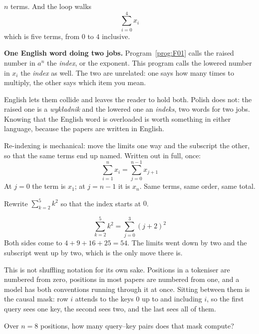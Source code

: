 \begin{fr}
\begin{ansblock}
$n$ terms. And the loop walks
\[ \sum_{i=0}^{4} x_i \]
which is five terms, from $0$ to $4$ inclusive.
\end{ansblock}

\begin{notationbox}
\textbf{One English word doing two jobs.} Program~\ref{prog:F01} calls the
raised number in $a^{n}$ the \emph{index}, or the exponent. This program calls
the lowered number in $x_i$ the \emph{index} as well. The two are unrelated:
one says how many times to multiply, the other says which item you mean.

English lets them collide and leaves the reader to hold both. Polish does not:
the raised one is a \emph{wykładnik} and the lowered one an \emph{indeks}, two
words for two jobs. Knowing that the English word is overloaded is worth
something in either language, because the papers are written in English.
\end{notationbox}

Re-indexing is mechanical: move the limits one way and the subscript the other,
so that the same terms end up named. Written out in full, once:
\[ \sum_{i=1}^{n} x_i = \sum_{j=0}^{n-1} x_{j+1} \]
At $j = 0$ the term is $x_1$; at $j = n-1$ it is $x_n$. Same terms, same
order, same total.

Rewrite $\sum_{k=2}^{5} k^{2}$ so that the index starts at $0$.
\nextframe
\end{fr}

\begin{fr}
\begin{ansblock}
\[ \sum_{k=2}^{5} k^{2} = \sum_{j=0}^{3} (j+2)^{2} \]
Both sides come to $4 + 9 + 16 + 25 = 54$. The limits went down by two and the
subscript went up by two, which is the only move there is.
\end{ansblock}

This is not shuffling notation for its own sake. Positions in a tokeniser are
numbered from zero, positions in most papers are numbered from one, and a
model has both conventions running through it at once. Sitting between them is
the causal mask: row $i$ attends to the keys $0$ up to and including $i$, so
the first query sees one key, the second sees two, and the last sees all of
them.

Over $n = 8$ positions, how many query--key pairs does that mask compute?
\nextframe
\end{fr}

